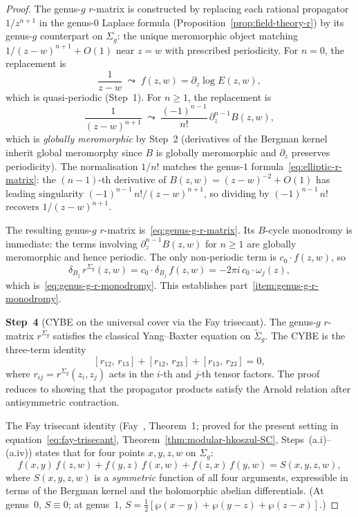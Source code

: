 \begin{proof}
The genus-$g$ $r$-matrix is constructed by replacing each
rational propagator $1/z^{n+1}$ in the genus-$0$ Laplace formula
(Proposition~\ref{prop:field-theory-r}) by its genus-$g$ counterpart
on $\Sigma_g$: the unique meromorphic object matching
$1/(z-w)^{n+1} + O(1)$ near $z = w$ with prescribed periodicity.
For $n = 0$, the replacement is
\[
\frac{1}{z-w} \;\leadsto\; f(z,w) = \partial_z \log E(z,w),
\]
which is quasi-periodic (Step~1).
For $n \ge 1$, the replacement is
\[
\frac{1}{(z-w)^{n+1}}
\;\leadsto\;
\frac{(-1)^{n-1}}{n!}\, \partial_z^{n-1} B(z,w),
\]
which is \emph{globally meromorphic} by Step~2 (derivatives of
the Bergman kernel inherit global meromorphy since $B$ is
globally meromorphic and $\partial_z$ preserves periodicity).
The normalisation $1/n!$ matches the genus-$1$
formula~\eqref{eq:elliptic-r-matrix}: the $(n{-}1)$-th derivative
of $B(z,w) = (z{-}w)^{-2} + O(1)$ has leading singularity
$(-1)^{n-1}\,n!/(z{-}w)^{n+1}$, so dividing by $(-1)^{n-1}\,n!$
recovers $1/(z{-}w)^{n+1}$.

The resulting genus-$g$ $r$-matrix is~\eqref{eq:genus-g-r-matrix}.
Its $B$-cycle monodromy is immediate: the terms involving
$\partial_z^{n-1} B(z,w)$ for $n \ge 1$ are globally meromorphic
and hence periodic. The only non-periodic term is
$c_0 \cdot f(z,w)$, so
\[
\delta_{B_j}\, r^{\Sigma_g}(z,w)
= c_0 \cdot \delta_{B_j}\, f(z,w)
= -2\pi i\, c_0 \cdot \omega_j(z),
\]
which is~\eqref{eq:genus-g-r-monodromy}. This establishes
part~\ref{item:genus-g-r-monodromy}.

\medskip
\textbf{Step~4} (CYBE on the universal cover via the Fay trisecant).
The genus-$g$ $r$-matrix $r^{\Sigma_g}$ satisfies the classical
Yang--Baxter equation on $\widetilde{\Sigma}_g$. The CYBE is
the three-term identity
\begin{equation}
\label{eq:CYBE-genus-g}
[r_{12},\, r_{13}] + [r_{12},\, r_{23}] + [r_{13},\, r_{23}] = 0,
\end{equation}
where $r_{ij} = r^{\Sigma_g}(z_i, z_j)$ acts in the $i$-th and
$j$-th tensor factors. The proof reduces to showing that the
propagator products satisfy the Arnold relation after
antisymmetric contraction.

The Fay trisecant identity (Fay~\cite{Fay73}, Theorem~1; proved
for the present setting in
equation~\eqref{eq:fay-trisecant},
Theorem~\ref{thm:modular-hkoszul-SC},
Steps~(a.i)--(a.iv)) states that for four points $x, y, z, w$ on
$\Sigma_g$:
\begin{equation}
\label{eq:fay-quadratic-recalled}
f(x,y)\, f(z,w) + f(y,z)\, f(x,w) + f(z,x)\, f(y,w)
= S(x,y,z,w),
\end{equation}
where $S(x,y,z,w)$ is a \emph{symmetric} function of all four
arguments, expressible in terms of the Bergman kernel and the
holomorphic abelian differentials. (At genus~$0$, $S \equiv 0$;
at genus~$1$,
$S = \tfrac{1}{2}[\wp(x{-}y) + \wp(y{-}z) + \wp(z{-}x)]$.)


\end{proof}

